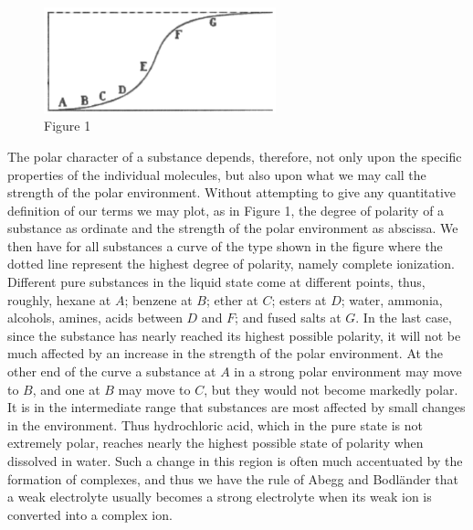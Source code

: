 \documentclass[11pt]{memoir}
\begin{document}
\renewcommand{\thefigure}{\arabic{figure}}
\setcounter{figure}{0}

\begin{figure}
	\begin{center}
		\includegraphics[width=0.6\textwidth]{images/lewis_figure1.png}
	\end{center}
	\caption*{Figure 1}


\end{figure}



The polar character of a substance depends, therefore, not only upon the specific properties of the individual molecules, but also upon what we may call the strength of the polar environment.  Without attempting to give any quantitative definition of our terms we may plot, as in Figure 1, the degree of polarity of a substance as ordinate and the strength of the polar environment as abscissa.  We then have for all substances a curve of the type shown in the figure where the dotted line represent the highest degree of polarity, namely complete ionization.  Different pure substances in the liquid state come at different points, thus, roughly, hexane at $A$; benzene at $B$; ether at $C$; esters at $D$; water, ammonia, alcohols, amines, acids between $D$ and $F$; and fused salts at $G$.  In the last case, since the substance has nearly reached its highest possible polarity, it will not be much affected by an increase in the strength of the polar environment.  At the other end of the curve a substance at $A$ in a strong polar environment may move to $B$, and one at $B$ may move to $C$, but they would not become markedly polar.  It is in the intermediate range that substances are most affected by small changes in the environment.  Thus hydrochloric acid, which in the pure state is not extremely polar, reaches nearly the highest possible state of polarity when dissolved in water.  Such a change in this region is often much accentuated by the formation of complexes, and thus we have the rule of Abegg and Bodl\"{a}nder that a weak electrolyte usually becomes a strong electrolyte when its weak ion is converted into a complex ion.
\end{document}
